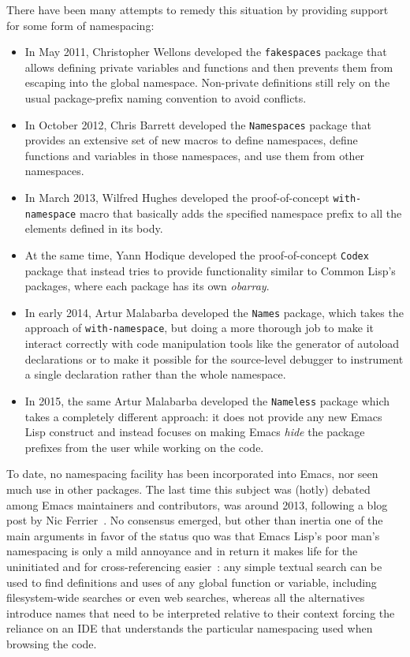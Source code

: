 \documentclass[format=acmsmall,screen]{acmart}
\newcommand \Elisp {Emacs Lisp}
\begin{document}
There have been many attempts to remedy this situation by providing support
for some form of namespacing:
\begin{itemize}
\item In May 2011, Christopher Wellons developed the \texttt{fakespaces} package that
  allows defining private variables and functions and then prevents them
  from escaping into the global namespace.  Non-private definitions still
  rely on the usual package-prefix naming convention to avoid conflicts.
\item In October 2012, Chris Barrett developed the \texttt{Namespaces} package that
  provides an extensive set of new macros to define namespaces, define
  functions and variables in those namespaces, and use them from
  other namespaces.
\item In March 2013, Wilfred Hughes developed the proof-of-concept
  \texttt{with-namespace} macro that basically adds the specified namespace
  prefix to all the elements defined in its body.
\item At the same time, Yann Hodique developed the proof-of-concept \texttt{Codex}
  package that instead tries to provide functionality similar to
  Common Lisp's packages, where each package has its own \emph{obarray}.
\item In early 2014, Artur Malabarba developed the \texttt{Names} package,
  which takes the approach of \texttt{with-namespace}, but doing a more
  thorough job to make it interact correctly with code manipulation tools
  like the generator of autoload declarations or to make it possible for the
  source-level debugger to instrument a single declaration rather than the
  whole namespace.
\item In 2015, the same Artur Malabarba developed the \texttt{Nameless}
  package which
  takes a completely different approach: it does not provide any new
  \Elisp{} construct and instead focuses on making Emacs \emph{hide} the
  package prefixes from the user while working on the code.
\end{itemize}
To date, no namespacing facility has been incorporated into Emacs, nor seen
much use in other packages.  The last time this subject was (hotly) debated
among Emacs maintainers and contributors, was around 2013, following a blog
post by Nic Ferrier~\cite{FerrierNamespaces}.
No consensus emerged, but other than inertia one of the
main arguments in favor of the status quo was that \Elisp's poor man's
namespacing is only a mild annoyance and in return it makes life for the
uninitiated and for cross-referencing easier~\cite{namespace-discussion}:
any simple textual
search can be
used to find definitions and uses of any global function or variable,
including filesystem-wide searches or even web searches,
whereas all the alternatives introduce names that need to be interpreted
relative to their context forcing the reliance on an IDE that understands the
particular namespacing used when browsing the code.
\end{document}
